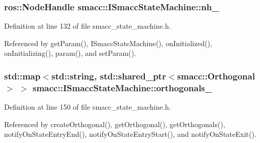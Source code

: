 \subsubsection[{\texorpdfstring{nh\+\_\+}{nh_}}]{\setlength{\rightskip}{0pt plus 5cm}ros\+::\+Node\+Handle smacc\+::\+I\+Smacc\+State\+Machine\+::nh\+\_\+\hspace{0.3cm}{\ttfamily [protected]}}\hypertarget{classsmacc_1_1ISmaccStateMachine_ad8877bcca9dbb345fe72cca839c93dd3}{}\label{classsmacc_1_1ISmaccStateMachine_ad8877bcca9dbb345fe72cca839c93dd3}


Definition at line 132 of file smacc\+\_\+state\+\_\+machine.\+h.



Referenced by get\+Param(), I\+Smacc\+State\+Machine(), on\+Initialized(), on\+Initializing(), param(), and set\+Param().

\subsubsection[{\texorpdfstring{orthogonals\+\_\+}{orthogonals_}}]{\setlength{\rightskip}{0pt plus 5cm}std\+::map$<$std\+::string, std\+::shared\+\_\+ptr$<${\bf smacc\+::\+Orthogonal}$>$ $>$ smacc\+::\+I\+Smacc\+State\+Machine\+::orthogonals\+\_\+\hspace{0.3cm}{\ttfamily [protected]}}\hypertarget{classsmacc_1_1ISmaccStateMachine_ae8e5c25d0aecd91fe496df13751bc667}{}\label{classsmacc_1_1ISmaccStateMachine_ae8e5c25d0aecd91fe496df13751bc667}


Definition at line 150 of file smacc\+\_\+state\+\_\+machine.\+h.



Referenced by create\+Orthogonal(), get\+Orthogonal(), get\+Orthogonals(), notify\+On\+State\+Entry\+End(), notify\+On\+State\+Entry\+Start(), and notify\+On\+State\+Exit().

